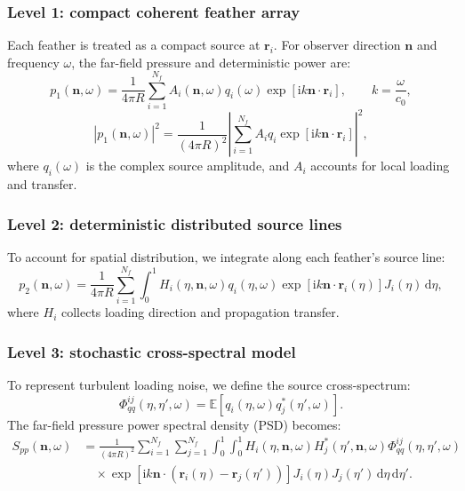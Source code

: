 \documentclass[11pt]{article}
\newcommand{\dd}{\,\mathrm{d}}
\newcommand{\ii}{\mathrm{i}}
\newcommand{\vect}[1]{\bm{#1}}
\newcommand{\E}{\mathbb{E}}
\begin{document}
\subsubsection{Level 1: compact coherent feather array}
Each feather is treated as a compact source at $\vect{r}_i$. For observer direction $\vect{n}$ and frequency $\omega$, the far-field pressure and deterministic power are:
\begin{equation}
    p_1(\vect{n},\omega)
    =
    \frac{1}{4\pi R}
    \sum_{i=1}^{N_f}
    A_i(\vect{n},\omega)
    q_i(\omega)
    \exp\left[
        \ii k\vect{n}\cdot\vect{r}_i
    \right],
    \qquad
    k=\frac{\omega}{c_0},
\label{eq:compact_array_pressure}
\end{equation}
\begin{equation}
    |p_1(\vect{n},\omega)|^2
    =
    \frac{1}{(4\pi R)^2}
    \left|
        \sum_{i=1}^{N_f}
        A_i q_i
        \exp\left[
            \ii k\vect{n}\cdot\vect{r}_i
        \right]
    \right|^2,
\end{equation}
where $q_i(\omega)$ is the complex source amplitude, and $A_i$ accounts for local loading and transfer.

\subsubsection{Level 2: deterministic distributed source lines}
To account for spatial distribution, we integrate along each feather's source line:
\begin{equation}
    p_2(\vect{n},\omega)
    =
    \frac{1}{4\pi R}
    \sum_{i=1}^{N_f}
    \int_0^1
    H_i(\eta,\vect{n},\omega)
    q_i(\eta,\omega)
    \exp\left[
        \ii k\vect{n}\cdot\vect{r}_i(\eta)
    \right]
    J_i(\eta)\dd\eta,
\label{eq:distributed_pressure}
\end{equation}
where $H_i$ collects loading direction and propagation transfer. 

\subsubsection{Level 3: stochastic cross-spectral model}
To represent turbulent loading noise, we define the source cross-spectrum:
\begin{equation}
    \Phi_{qq}^{ij}(\eta,\eta',\omega)
    =
    \E\left[
        q_i(\eta,\omega)q_j^*(\eta',\omega)
    \right].
\label{eq:continuous_cross_spectrum}
\end{equation}
The far-field pressure power spectral density (PSD) becomes:
\begin{align}
    \label{eq:continuous_psd}
    S_{pp}(\vect{n},\omega)
    &=
    \frac{1}{(4\pi R)^2}
    \sum_{i=1}^{N_f}
    \sum_{j=1}^{N_f}
    \int_0^1
    \int_0^1
    H_i(\eta,\vect{n},\omega)
    H_j^*(\eta',\vect{n},\omega)
    \Phi_{qq}^{ij}(\eta,\eta',\omega)
    \nonumber\\
    &\quad\times
    \exp\left[
        \ii k\vect{n}\cdot
        \left(
            \vect{r}_i(\eta)-\vect{r}_j(\eta')
        \right)
    \right]
    J_i(\eta)J_j(\eta')\dd\eta\dd\eta'.
\end{align}
\end{document}
